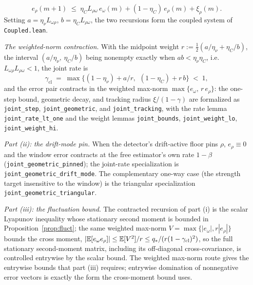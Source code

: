 \[
e_\rho(m{+}1) \;\le\; \eta_C L_{\rho\omega}\, e_\omega(m) + (1-\eta_C)\,e_\rho(m) + \xi_\rho(m).
\]
Setting $a = \eta_\nu L_{\omega\rho}$, $b = \eta_C L_{\rho\omega}$, the two recursions form the coupled system of \texttt{Coupled.lean}.

\emph{The weighted-norm contraction.}
With the midpoint weight $r := \tfrac12(a/\eta_\nu + \eta_C/b)$, the interval $(a/\eta_\nu,\ \eta_C/b)$ being nonempty exactly when $ab < \eta_\nu\eta_C$, i.e.\ $L_{\omega\rho}L_{\rho\omega} < 1$, the joint rate is
\[
\gamma_{\mathrm{cl}} \;=\; \max\bigl\{(1-\eta_\nu) + a/r,\ \ (1-\eta_C) + r\,b\bigr\} \;<\; 1,
\]
and the error pair contracts in the weighted max-norm $\max\{e_\omega,\, r\,e_\rho\}$: the one-step bound, geometric decay, and tracking radius $\xi/(1-\gamma)$ are formalized as \texttt{joint\_step}, \texttt{joint\_geometric}, and \texttt{joint\_tracking}, with the rate lemma \texttt{joint\_rate\_lt\_one} and the weight lemmas \texttt{joint\_bounds}, \texttt{joint\_weight\_lo}, \texttt{joint\_weight\_hi}.

\emph{Part (ii): the drift-mode pin.}
When the detector's drift-active floor pins $\rho$, $e_\rho \equiv 0$ and the window error contracts at the free estimator's own rate $1-\beta$ (\texttt{joint\_geometric\_pinned}); the joint-rate specialization is \texttt{joint\_geometric\_drift\_mode}.
The complementary one-way case (the strength target insensitive to the window) is the triangular specialization \texttt{joint\_geometric\_triangular}.

\emph{Part (iii): the fluctuation bound.}
The contracted recursion of part (i) is the scalar Lyapunov inequality whose stationary second moment is bounded in Proposition~\ref{prop:fluct}; the same weighted max-norm $V = \max\{|e_\omega|, r|e_\rho|\}$ bounds the cross moment, $|\mathbb{E}[e_\omega e_\rho]| \le \mathbb{E}[V^2]/r \le q_*/(r(1-\gamma_{\mathrm{cl}})^2)$, so the full stationary second-moment matrix, including its off-diagonal cross-covariance, is controlled entrywise by the scalar bound. The weighted max-norm route gives the entrywise bounds that part (iii) requires; entrywise domination of nonnegative error vectors is exactly the form the cross-moment bound uses.

